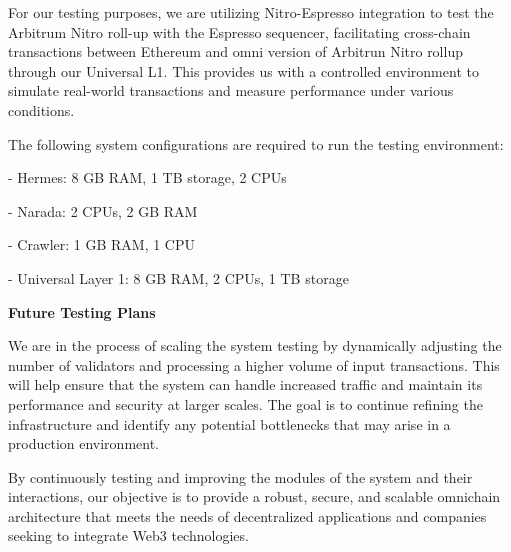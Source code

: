 For our testing purposes, we are utilizing Nitro-Espresso integration to test the Arbitrum Nitro roll-up with the Espresso sequencer, facilitating cross-chain transactions between Ethereum and omni version of Arbitrun Nitro rollup through our Universal L1. This provides us with a controlled environment to simulate real-world transactions and measure performance under various conditions.

The following system configurations are required to run the testing environment:

- Hermes: 8 GB RAM, 1 TB storage, 2 CPUs

- Narada: 2 CPUs, 2 GB RAM

- Crawler: 1 GB RAM, 1 CPU

- Universal Layer 1: 8 GB RAM, 2 CPUs, 1 TB storage

\textbf{Future Testing Plans}

We are in the process of scaling the system testing by dynamically adjusting the number of validators and processing a higher volume of input transactions. This will help ensure that the system can handle increased traffic and maintain its performance and security at larger scales. The goal is to continue refining the infrastructure and identify any potential bottlenecks that may arise in a production environment.

By continuously testing and improving the modules of the system and their interactions, our objective is to provide a robust, secure, and scalable omnichain architecture that meets the needs of decentralized applications and companies seeking to integrate Web3 technologies.